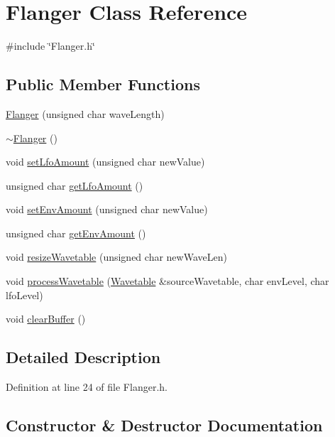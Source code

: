 \hypertarget{class_flanger}{}\section{Flanger Class Reference}
\label{class_flanger}


{\ttfamily \#include \char`\"{}Flanger.\+h\char`\"{}}

\subsection*{Public Member Functions}
\begin{DoxyCompactItemize}
\item 
\hyperlink{class_flanger_a973e269aa2e2bab6c56e9d4c92b85baf}{Flanger} (unsigned char wave\+Length)
\item 
\hyperlink{class_flanger_ab37e3e9863d1f762ed25147dd8db2dec}{$\sim$\+Flanger} ()
\item 
void \hyperlink{class_flanger_a311ea2020c379266da75e57bec0cc5ad}{set\+Lfo\+Amount} (unsigned char new\+Value)
\item 
unsigned char \hyperlink{class_flanger_a6d6289cd3c9ef3cc997e83441a89194f}{get\+Lfo\+Amount} ()
\item 
void \hyperlink{class_flanger_ac4f38ebccacae85c724fe43f13caf636}{set\+Env\+Amount} (unsigned char new\+Value)
\item 
unsigned char \hyperlink{class_flanger_ae86b7a0721c3a9893f3b9ec5f4b6c0fb}{get\+Env\+Amount} ()
\item 
void \hyperlink{class_flanger_a382a9889299da650998fe547dd859c5f}{resize\+Wavetable} (unsigned char new\+Wave\+Len)
\item 
void \hyperlink{class_flanger_af0c970c914193ea326ca177869f508c1}{process\+Wavetable} (\hyperlink{class_wavetable}{Wavetable} \&source\+Wavetable, char env\+Level, char lfo\+Level)
\item 
void \hyperlink{class_flanger_ae94929f1469d1924d24537e2b265796d}{clear\+Buffer} ()
\end{DoxyCompactItemize}


\subsection{Detailed Description}


Definition at line 24 of file Flanger.\+h.



\subsection{Constructor \& Destructor Documentation}
\mbox{\label{class_flanger_a973e269aa2e2bab6c56e9d4c92b85baf}} 
